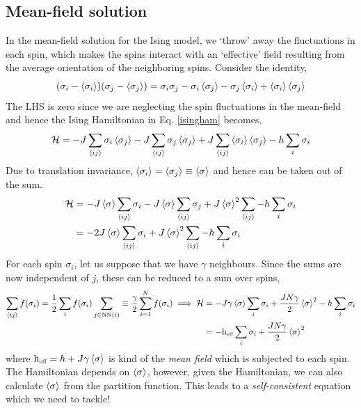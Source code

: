 \subsection{Mean-field solution}
In the mean-field solution for the Ising model, we `throw' away the fluctuations in each spin, which makes the spins interact with an `effective' field resulting from the average orientation of the neighboring spins. Consider the identity,
\begin{equation}
   { (\sigma_i-\left\langle \sigma_i \right\rangle )} (\sigma_j-\left\langle \sigma_j \right\rangle ) = \sigma_i\sigma_j -\sigma_i\left\langle \sigma_j \right\rangle -\sigma_j\left\langle \sigma_i \right\rangle + \left\langle \sigma_i \right\rangle\left\langle \sigma_j \right\rangle
\end{equation}
The LHS is zero since we are neglecting the spin fluctuations in the mean-field and hence the Ising Hamiltonian in Eq. \eqref{isingham} becomes, 
\begin{align*}
    \mathcal H = -J\sum\limits_{\left\langle ij \right\rangle} \sigma_i \left\langle \sigma_j \right\rangle-J\sum\limits_{\left\langle ij \right\rangle} \sigma_j \left\langle \sigma_j \right\rangle +J\sum\limits_{\left\langle ij \right\rangle} \left\langle \sigma_i \right\rangle \left\langle \sigma_j \right\rangle-h\sum\limits_{i}\sigma_i
\end{align*}
Due to translation invariance, $\left\langle \sigma_i \right\rangle = \left\langle \sigma_j \right\rangle \equiv \left\langle \sigma \right\rangle$ and hence can be taken out of the sum. 
\begin{align*}
    \mathcal H &= -J\left\langle \sigma \right\rangle\sum\limits_{\left\langle ij \right\rangle}\sigma_i  -J\left\langle \sigma \right\rangle\sum\limits_{\left\langle ij \right\rangle}\sigma_j +  J\left\langle \sigma \right\rangle^2\sum\limits_{\left\langle ij \right\rangle} - h\sum\limits_i \sigma_i \\
    &=-2J\left\langle \sigma \right\rangle\sum\limits_{\left\langle ij \right\rangle}\sigma_i  +J\left\langle \sigma \right\rangle^2\sum\limits_{\left\langle ij \right\rangle} - h\sum\limits_i \sigma_i
\end{align*}
For each spin $\sigma_i$, let us suppose that we have $\gamma$ neighbours. Since the sums are now independent of $j$, these can be reduced to a sum over spins,
\begin{align}
    \begin{split}
        \sum\limits_{\left\langle ij \right\rangle}f(\sigma_i) =\frac{1}{2}\sum_i f(\sigma_i) \sum_{j\in \mathrm{NN}(i)} \equiv \frac{\gamma}{2}\sum_{i=1}^N f(\sigma_i) \implies \mathcal H &= -J\gamma\left\langle \sigma \right\rangle\sum_i \sigma_i+\frac{JN\gamma}{2}\left\langle \sigma \right\rangle^2 -h\sum_i\sigma_i \\
        &= -\mathrm{h}_{\text{\tiny eff}} \sum_i \sigma_i +\frac{JN\gamma}{2}\left\langle \sigma \right\rangle^2
    \end{split}
\end{align}
where $\mathrm{h}_{\text{\tiny eff}} = h+J\gamma \left\langle \sigma \right\rangle$ is kind of the \textit{mean field} which is subjected to each spin. The Hamiltonian depends on $\left\langle \sigma \right\rangle$, however, given the Hamiltonian, we can also calculate $\left\langle \sigma \right\rangle$ from the partition function. This leads to a \textit{self-consistent} equation which we need to tackle!


